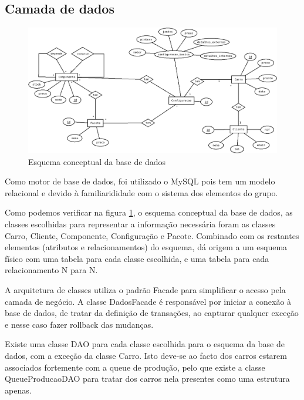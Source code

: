 \documentclass{llncs}
\begin{document}
\subsection{Camada de dados}

\begin{figure}
\begin{center}
\includegraphics[scale=0.33]{esquema_conceptual.png}
\end{center}
\caption{\label{fig:esquema_conceptual}Esquema conceptual da base de dados}
\end{figure}

Como motor de base de dados, foi utilizado o MySQL pois tem um modelo relacional e devido à familiarididade com o sistema dos elementos do grupo.

Como podemos verificar na figura \ref{fig:esquema_conceptual}, o esquema conceptual da base de dados, as classes escolhidas para representar a informação necessária foram as classes Carro, Cliente, Componente, Configuração e Pacote. Combinado com os restantes elementos (atributos e relacionamentos) do esquema, dá origem a um esquema físico com uma tabela para cada classe escolhida, e uma tabela para cada relacionamento N para N.

A arquitetura de classes utiliza o padrão Facade para simplificar o acesso pela camada de negócio. A classe DadosFacade é responsável por iniciar a conexão à base de dados, de tratar da definição de transações, ao capturar qualquer exceção e nesse caso fazer rollback das mudanças.

Existe uma classe DAO para cada classe escolhida para o esquema da base de dados, com a exceção da classe Carro. Isto deve-se ao facto dos carros estarem associados fortemente com a queue de produção, pelo que existe a classe QueueProducaoDAO para tratar dos carros nela presentes como uma estrutura apenas.
\end{document}
